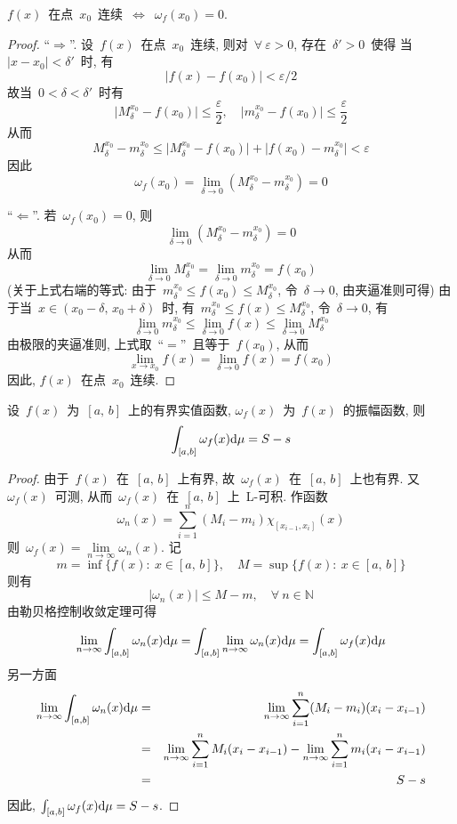 \begin{proposition} \label{prop441}
$f(x)$~在点~$x_0$~连续~$\Longleftrightarrow$~$\omega_f(x_0) = 0$.
\end{proposition}

\begin{proof}
``$\Rightarrow$''. 设~$f(x)$~在点~$x_0$~连续, 则对~$\forall~\varepsilon > 0$, 存在~$\delta' > 0$~使得
当~$|x - x_0| < \delta'$~时, 有
\[
\big|f(x) - f(x_0)\big| < \varepsilon/2
\]
故当~$0 < \delta <\delta'$~时有
\[
\big|M^{x_0}_\delta - f(x_0) \big| \leqslant \frac{\varepsilon}{2},    \quad \big| m^{x_0}_\delta - f(x_0) \big| \leqslant \frac{\varepsilon}{2}
\]
从而
\[
M^{x_0}_\delta - m^{x_0}_\delta \leqslant \big|M^{x_0}_\delta - f(x_0) \big| + \big| f(x_0) - m^{x_0}_\delta\big| < \varepsilon
\]
因此
\[
\omega_f(x_0) = \lim\limits_{\delta \to 0} (M^{x_0}_\delta - m^{x_0}_\delta) = 0
\]


``$\Leftarrow$''. 若~$\omega_f(x_0)=0$, 则
\[
\lim\limits_{\delta \to 0} (M^{x_0}_\delta - m^{x_0}_\delta) = 0
\]
从而
\[
\lim_{\delta \to 0} M^{x_0}_\delta = \lim_{\delta \to 0} m^{x_0}_\delta = f(x_0)
\]
(关于上式右端的等式: 由于~$m^{x_0}_\delta \leqslant f(x_0) \leqslant M^{x_0}_\delta$, 令~$\delta \to 0$,  由夹逼准则可得)
由于当~$x \in (x_0 - \delta,\,  x_0 + \delta)$~时, 有~$m^{x_0}_\delta \leqslant f(x) \leqslant M^{x_0}_\delta$, 令~$\delta \to 0$, 有
\[
\lim_{\delta \to 0} m^{x_0}_\delta \leqslant \lim_{\delta \to 0} f(x) \leqslant \lim_{\delta \to 0} M^{x_0}_\delta
\]
由极限的夹逼准则, 上式取~``$=$''~且等于~$f(x_0)$, 从而
\[
\lim_{x \to x_0} f(x) = \lim_{\delta \to 0} f(x) = f(x_0)
\]
因此, $f(x)$~在点~$x_0$~连续.
\end{proof}

\begin{lemma} \label{lem441}
设~$f(x)$~为~$[a,\, b]$~上的有界实值函数, $\omega_f(x)$~为~$f(x)$~的振幅函数, 则
\[
\int_{[a,b]} \omega_f(x) \mathrm{d} \mu = S - s
\]
\end{lemma}

\begin{proof}
由于~$f(x)$~在~$[a,\, b]$~上有界, 故~$\omega_f(x)$~在~$[a,\, b]$~上也有界. 又~$\omega_f(x)$~可测,
从而~$\omega_f(x)$~在~$[a,\, b]$~上~L-可积. 作函数
\[
\omega_n(x) = \sum_{i=1}^n (M_i - m_i) \chi_{[x_{i-1},x_i]}(x)
\]
则~$\omega_f(x) = \lim\limits_{n \to \infty} \omega_n(x)$. 记
\[
m = \inf\{f(x):\: x \in [a,\, b]\}, \quad M = \sup\{f(x):\: x \in [a,\, b]\}
\]
则有
\[
\big|\omega_n(x)\big| \leqslant M - m,\quad \forall~n \in \mathbb{N}
\]
由勒贝格控制收敛定理可得
\[
\lim_{n \to \infty} \int_{[a,b]} \omega_n(x) \mathrm{d} \mu =  \int_{[a,b]} \lim_{n \to \infty} \omega_n(x)
\mathrm{d} \mu = \int_{[a,b]} \omega_f(x) \mathrm{d} \mu
\]
另一方面
\begin{eqnarray*}
\lim_{n \to \infty} \int_{[a,b]} \omega_n(x) \mathrm{d} \mu &=& \lim_{n \to \infty} \sum_{i=1}^n (M_i - m_i)
(x_i - x_{i-1}) \\
&=& \lim_{n \to \infty} \sum_{i=1}^n M_i (x_i - x_{i-1}) - \lim_{n \to \infty} \sum_{i=1}^n m_i (x_i - x_{i-1}) \\
&=& S - s
\end{eqnarray*}
因此, $\int_{[a,b]} \omega_f(x) \mathrm{d} \mu = S - s$.
\end{proof}

